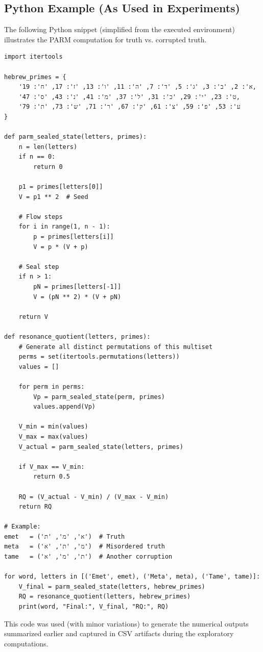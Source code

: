 \documentclass[11pt]{article}
\begin{document}
\subsection{Python Example (As Used in Experiments)}

The following Python snippet (simplified from the executed environment) illustrates the PARM computation for truth vs. corrupted truth.\cite{corruptiontest}

\begin{verbatim}
import itertools

hebrew_primes = {
    'א': 2, 'ב': 3, 'ג': 5, 'ד': 7, 'ה': 11, 'ו': 13, 'ז': 17, 'ח': 19,
    'ט': 23, 'י': 29, 'כ': 31, 'ל': 37, 'מ': 41, 'נ': 43, 'ס': 47,
    'ע': 53, 'פ': 59, 'צ': 61, 'ק': 67, 'ר': 71, 'ש': 73, 'ת': 79
}

def parm_sealed_state(letters, primes):
    n = len(letters)
    if n == 0:
        return 0

    p1 = primes[letters[0]]
    V = p1 ** 2  # Seed

    # Flow steps
    for i in range(1, n - 1):
        p = primes[letters[i]]
        V = p * (V + p)

    # Seal step
    if n > 1:
        pN = primes[letters[-1]]
        V = (pN ** 2) * (V + pN)

    return V

def resonance_quotient(letters, primes):
    # Generate all distinct permutations of this multiset
    perms = set(itertools.permutations(letters))
    values = []

    for perm in perms:
        Vp = parm_sealed_state(perm, primes)
        values.append(Vp)

    V_min = min(values)
    V_max = max(values)
    V_actual = parm_sealed_state(letters, primes)

    if V_max == V_min:
        return 0.5

    RQ = (V_actual - V_min) / (V_max - V_min)
    return RQ

# Example:
emet   = ('א', 'מ', 'ת')  # Truth
meta   = ('מ', 'ת', 'א')  # Misordered truth
tame   = ('ת', 'מ', 'א')  # Another corruption

for word, letters in [('Emet', emet), ('Meta', meta), ('Tame', tame)]:
    V_final = parm_sealed_state(letters, hebrew_primes)
    RQ = resonance_quotient(letters, hebrew_primes)
    print(word, "Final:", V_final, "RQ:", RQ)
\end{verbatim}

This code was used (with minor variations) to generate the numerical outputs summarized earlier and captured in CSV artifacts during the exploratory computations.\cite{corruptiontest,semantictest}
\end{document}
